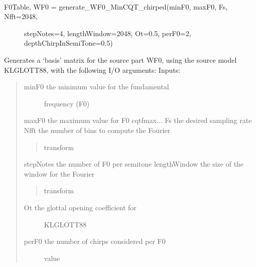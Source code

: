 \documentclass[letterpaper,10pt,english]{sphinxmanual}
\begin{document}
\begin{fulllineitems}
\label{reference/separateleadfunctions:pyfasst.SeparateLeadStereo.separateLeadFunctions.generate_WF0_MinQT_chirped}~\begin{description}
\item[{F0Table, WF0 = generate\_WF0\_MinCQT\_chirped(minF0, maxF0, Fs, Nfft=2048,}] \leavevmode
stepNotes=4, lengthWindow=2048,
Ot=0.5, perF0=2,
depthChirpInSemiTone=0.5)

\end{description}

Generates a `basis' matrix for the source part WF0, using the
source model KLGLOTT88, with the following I/O arguments:
Inputs:
\begin{quote}
\begin{description}
\item[{minF0                the minimum value for the fundamental}] \leavevmode
frequency (F0)

\end{description}

maxF0                the maximum value for F0
cqtfmax...
Fs                   the desired sampling rate
Nfft                 the number of bins to compute the Fourier
\begin{quote}

transform
\end{quote}

stepNotes            the number of F0 per semitone
lengthWindow         the size of the window for the Fourier
\begin{quote}

transform
\end{quote}
\begin{description}
\item[{Ot                   the glottal opening coefficient for}] \leavevmode
KLGLOTT88

\item[{perF0                the number of chirps considered per F0}] \leavevmode
value


\end{description}
\end{quote}
\end{fulllineitems}
\end{document}
